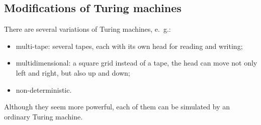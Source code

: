 

\setcounter{section}{8}
\setcounter{subsection}{3}
\setcounter{dfn}{4}

\subsection{Modifications of Turing machines}
There are several variations of Turing machines, e.~g.:
\begin{itemize}
\item
multi-tape: several tapes, each with its own head for reading and writing;
\item
multidimensional: a square grid instead of a tape, the head can move not only left and right, but also up and down;
\item
non-deterministic.
\end{itemize}
Although they seem more powerful, each of them can be simulated by an ordinary Turing machine.




